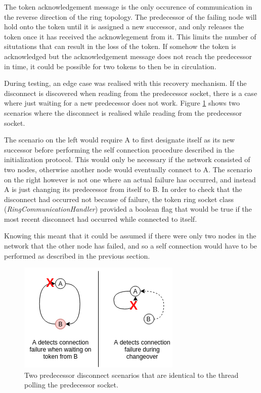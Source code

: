 \documentclass[12pt]{article}
\begin{document}
The token acknowledgement message is the only occurence of communication in the reverse direction of the ring topology. The predecessor of the failing node will hold onto the token until it is assigned a new successor, and only releases the token once it has received the acknowlegement from it. This limits the number of situtations that can result in the loss of the token. If somehow the token is acknowledged but the acknowledgement message does not reach the predecessor in time, it could be possible for two tokens to then be in circulation. 

During testing, an edge case was realised with this recovery mechanism. If the disconnect is discovered when reading from the predecessor socket, there is a case where just waiting for a new predecessor does not work. Figure \ref{fig:hard} shows two scenarios where the disconnect is realised while reading from the predecessor socket. 

The scenario on the left would require A to first designate itself as its new successor before performing the self connection procedure described in the initialization protocol. This would only be necessary if the network consisted of two nodes, otherwise another node would eventually connect to A. The scenario on the right however is not one where an actual failure has occurred, and instead A is just changing its predecessor from itself to B. In order to check that the disconnect had occurred not because of failure, the token ring socket class (\emph{RingCommunicationHandler}) provided a boolean flag that would be true if the most recent disconnect had occurred while connected to itself. 

Knowing this meant that it could be assumed if there were only two nodes in the network that the other node has failed, and so a self connection would have to be performed as described in the previous section.

\begin{figure}[!ht]
	\centering
	\includegraphics[width=0.6\linewidth]{images/hard}
	\caption{Two predecessor disconnect scenarios that are identical to the thread polling the predecessor socket.}
	\label{fig:hard}
\end{figure}
\end{document}
